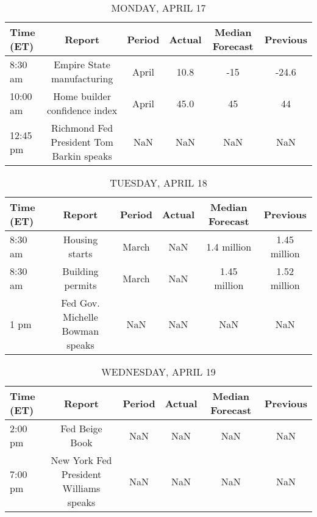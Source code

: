 \documentclass{article}%
\begin{document}
%
\normalsize%


\begin{table}[htbp]%
\caption{MONDAY, APRIL 17}%
\centering%
\begin{adjustbox}{width=1\textwidth}%
\begin{tabular}{lccccc}
\toprule
Time (ET) &                                   Report & Period & Actual & Median Forecast & Previous \\
\midrule
  8:30 am &               Empire State manufacturing &  April &   10.8 &             -15 &    -24.6 \\
 10:00 am &            Home builder confidence index &  April &   45.0 &              45 &       44 \\
 12:45 pm & Richmond Fed President Tom Barkin speaks &    NaN &    NaN &             NaN &      NaN \\
\bottomrule
\end{tabular}
%
\end{adjustbox}%
\end{table}

%


\begin{table}[htbp]%
\caption{TUESDAY, APRIL 18}%
\centering%
\begin{adjustbox}{width=1\textwidth}%
\begin{tabular}{lccccc}
\toprule
Time (ET) &                          Report & Period & Actual & Median Forecast &     Previous \\
\midrule
  8:30 am &                  Housing starts &  March &    NaN &     1.4 million & 1.45 million \\
  8:30 am &                Building permits &  March &    NaN &    1.45 million & 1.52 million \\
     1 pm & Fed Gov. Michelle Bowman speaks &    NaN &    NaN &             NaN &          NaN \\
\bottomrule
\end{tabular}
%
\end{adjustbox}%
\end{table}

%


\begin{table}[htbp]%
\caption{WEDNESDAY, APRIL 19}%
\centering%
\begin{adjustbox}{width=1\textwidth}%
\begin{tabular}{lccccc}
\toprule
Time (ET) &                                 Report & Period & Actual & Median Forecast & Previous \\
\midrule
  2:00 pm &                         Fed Beige Book &    NaN &    NaN &             NaN &      NaN \\
  7:00 pm & New York Fed President Williams speaks &    NaN &    NaN &             NaN &      NaN \\
\bottomrule
\end{tabular}
%
\end{adjustbox}%
\end{table}
\end{document}
